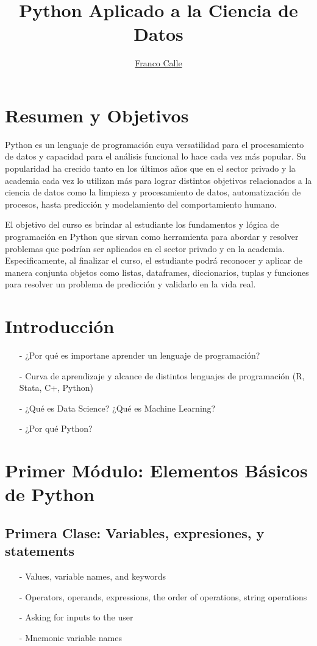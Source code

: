 \documentclass[12pt]{article}
\title{Python Aplicado a la Ciencia de Datos}
\author{\href{http://francocalle.github.io/}{Franco Calle}}
\date{}
\begin{document}
\maketitle

\section*{Resumen y Objetivos}

Python es un lenguaje de programación cuya versatilidad para el procesamiento de datos y capacidad para el análisis funcional lo hace cada vez más popular. Su popularidad ha crecido tanto en los últimos años que en el sector privado y la academia cada vez lo utilizan más para lograr distintos objetivos relacionados a la ciencia de datos como la limpieza y procesamiento de datos, automatización de procesos, hasta predicción y modelamiento del comportamiento humano.

El objetivo del curso es brindar al estudiante los fundamentos y lógica de programación en Python que sirvan como herramienta para abordar y resolver problemas que podrían ser aplicados en el sector privado y en la academia. Especificamente, al finalizar el curso, el estudiante podrá reconocer y aplicar de manera conjunta objetos como listas, dataframes, diccionarios, tuplas y funciones para resolver un problema de predicción y validarlo en la vida real.

\section*{Introducción}

\begin{itemize}
\item[-] ¿Por qué es importane aprender un lenguaje de programación?
\item[-] Curva de aprendizaje y alcance de distintos lenguajes de programación  (R, Stata, C+, Python)
\item[-] ¿Qué es Data Science? ¿Qué es Machine Learning?
\item[-] ¿Por qué Python?
\end{itemize}

\section*{Primer Módulo: Elementos Básicos de Python}

\subsection*{Primera Clase: Variables, expresiones, y statements}
\begin{itemize}
\item[-]	Values, variable names, and keywords
\item[-]	Operators, operands, expressions, the order of operations, string operations
\item[-]	Asking for inputs to the user
\item[-]	Mnemonic variable names
\end{itemize}
\end{document}
